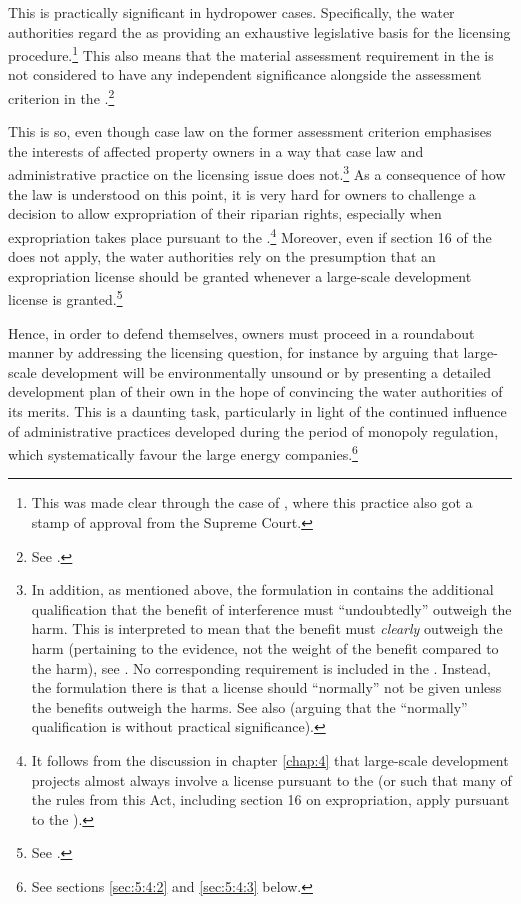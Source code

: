 This is practically significant in hydropower cases. Specifically, the water authorities regard the \cite{wra17} as providing an exhaustive legislative basis for the licensing procedure.\footnote{This was made clear through the case of \cite{jorpeland11}, where this practice also got a stamp of approval from the Supreme Court.} This also means that the material assessment requirement in the \cite{ea59} is not considered to have any independent significance alongside the assessment criterion in the \cite{wra17}.\footnote{See \cite[30]{jorpeland11}.}

This is so, even though case law on the former assessment criterion emphasises the interests of affected property owners in a way that case law and administrative practice on the licensing issue does not.\footnote{In addition, as mentioned above, the formulation in \dni\cite[2]{ea59} contains the additional qualification that the benefit of interference must ``undoubtedly'' outweigh the harm. This is interpreted to mean that the benefit must {\it clearly} outweigh the harm (pertaining to the evidence, not the weight of the benefit compared to the harm), see \cite{lovenskiold09}. No corresponding requirement is included in the \dni\cite[8]{wra17}. Instead, the formulation there is that a license should ``normally'' not be given unless the benefits outweigh the harms. See also \cite[325-236]{haagensen02} (arguing that the ``normally'' qualification is without practical significance).} As a consequence of how the law is understood on this point, it is very hard for owners to challenge a decision to allow expropriation of their riparian rights, especially when expropriation takes place pursuant to the \cite{wra17}.\footnote{It follows from the discussion in chapter \ref{chap:4} that large-scale development projects almost always involve a license pursuant to the \cite{wra17} (or such that many of the rules from this Act, including section 16 on expropriation, apply pursuant to the \cite{wra00}).} Moreover, even if section 16 of the \cite{wra17} does not apply, the water authorities rely on the presumption that an expropriation license should be granted whenever a large-scale development license is granted.\footnote{See \cite{flatby08}.}

Hence, in order to defend themselves, owners must proceed in a roundabout manner by addressing the licensing question, for instance by arguing that large-scale development will be environmentally unsound or by presenting a detailed development plan of their own in the hope of convincing the water authorities of its merits. This is a daunting task, particularly in light of the continued influence of administrative practices developed during the period of monopoly regulation, which systematically favour the large energy companies.\footnote{See sections \ref{sec:5:4:2} and \ref{sec:5:4:3} below.}

